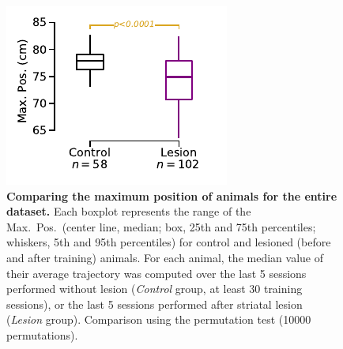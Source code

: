 \begin{figure}[!h]
  \begin{center}
    \includegraphics[scale=1]{ch-appendicies/figures/AllRatMaxPos.pdf}
    \caption[Group Max.\ Pos.\ Comparison]
    {\textbf{Comparing the maximum position of animals for the entire dataset.}
    Each boxplot represents the range of the Max.\ Pos.\ (center line, median; box, 25th and 75th percentiles; whiskers, 5th and 95th percentiles) for control and lesioned (before and after training) animals.
    For each animal, the median value of their average trajectory was computed over the last 5 sessions performed without lesion (\textit{Control} group, at least 30 training sessions), or the last 5 sessions performed after striatal lesion (\textit{Lesion} group).
    Comparison using the permutation test (10000 permutations).
    }
    \label{fig:appendix:AllRatMaxPos}
  \end{center}
\end{figure}